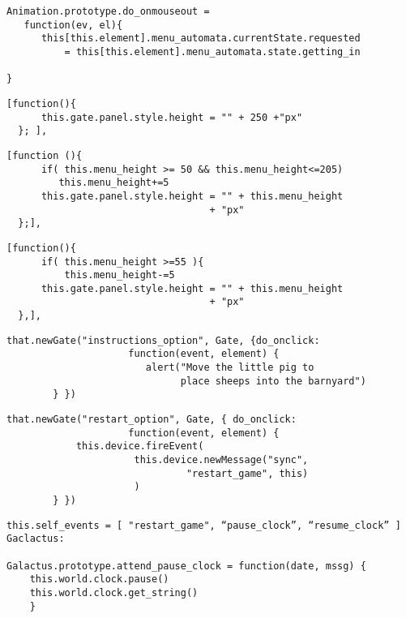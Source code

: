 \begin{lstlisting}[caption=Clase Button, label={lst:code5123}]
Animation.prototype.do_onmouseout = 
   function(ev, el){
      this[this.element].menu_automata.currentState.requested 
          = this[this.element].menu_automata.state.getting_in

}
\end{lstlisting}


\begin{lstlisting}[caption=Estado out, label={lst:code5211}]
  [function(){
      this.gate.panel.style.height = "" + 250 +"px" 
  }; ],
\end{lstlisting}


\begin{lstlisting}[caption=Estado getting\_out, label={lst:code5212}]
  [function (){
      if( this.menu_height >= 50 && this.menu_height<=205)
         this.menu_height+=5
      this.gate.panel.style.height = "" + this.menu_height 
                                   + "px"
  };],
\end{lstlisting}


\begin{lstlisting}[caption=Estado getting\_in, label={lst:code5213}]
  [function(){
      if( this.menu_height >=55 ){         
          this.menu_height-=5
      this.gate.panel.style.height = "" + this.menu_height 
                                   + "px"
  },],
\end{lstlisting}

\begin{lstlisting}[caption=Instructions\_option Gate, label={lst:code5221}]
that.newGate("instructions_option", Gate, {do_onclick: 
                     function(event, element) {
                        alert("Move the little pig to
                              place sheeps into the barnyard")
        } })
\end{lstlisting}

\begin{lstlisting}[caption=restart\_option, label={lst:code5222}]
 that.newGate("restart_option", Gate, { do_onclick: 
                     function(event, element) {
            this.device.fireEvent(
                      this.device.newMessage("sync", 
                               "restart_game", this)
                      )
        } })
\end{lstlisting}


\begin{lstlisting}[caption=variable self\_events, label={lst:code5231}]
this.self_events = [ "restart_game", “pause_clock”, “resume_clock” ]
Gaclactus:

Galactus.prototype.attend_pause_clock = function(date, mssg) {
    this.world.clock.pause()
    this.world.clock.get_string()
    }
\end{lstlisting}

